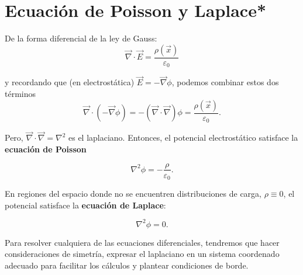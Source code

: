 \section{Ecuación de Poisson y Laplace*}

De la forma diferencial de la ley de Gauss:
$$\Vec{\nabla} \cdot \Vec{E} = \frac{\rho(\Vec{x})}{\varepsilon_0}$$

y recordando que (en electrostática) $\Vec{E} = - \Vec{\nabla} \phi$, podemos combinar estos dos términos
$$\Vec{\nabla} \cdot (- \Vec{\nabla} \phi) = - (\Vec{\nabla} \cdot\Vec{\nabla} ) \phi = \frac{\rho(\Vec{x})}{\varepsilon_0}.$$

Pero, $\Vec{\nabla} \cdot\Vec{\nabla} = \nabla^2$ es el laplaciano. Entonces, el potencial electrostático satisface la \textbf{ecuación de Poisson}
\begin{shaded}
    $$\nabla^2 \phi = - \frac{\rho}{\varepsilon_0}.$$
\end{shaded}

En regiones del espacio donde no se encuentren distribuciones de carga, $\rho \equiv 0$, el potencial satisface la \textbf{ecuación de Laplace}:
\begin{shaded}
    $$\nabla^2 \phi = 0.$$
\end{shaded}

Para resolver cualquiera de las ecuaciones diferenciales, tendremos que hacer consideraciones de simetría, expresar el laplaciano en un sistema coordenado adecuado para facilitar los cálculos y plantear condiciones de borde.

